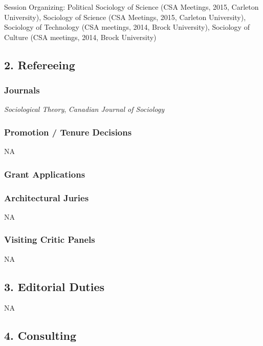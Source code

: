 \documentclass[9pt,usenames,dvipsnames]{article}
\begin{document}
\noindent Session Organizing: Political Sociology of Science (CSA Meetings, 2015, Carleton University), Sociology of Science (CSA Meetings, 2015, Carleton University), Sociology of Technology (CSA meetings, 2014, Brock University), Sociology of Culture (CSA meetings, 2014, Brock University)

\subsection*{2. Refereeing}

\subsubsection*{Journals}

\emph{Sociological Theory}, \emph{Canadian Journal of Sociology}

\subsubsection*{Promotion / Tenure Decisions}

NA

\subsubsection*{Grant Applications}

\subsubsection*{Architectural Juries}

NA

\subsubsection*{Visiting Critic Panels}

NA 

\subsection*{3. Editorial Duties}

NA

\subsection*{4. Consulting}
\end{document}
